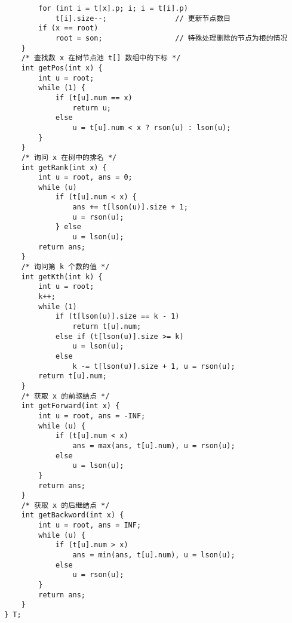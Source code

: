 \begin{verbatim}
        for (int i = t[x].p; i; i = t[i].p)
            t[i].size--;                // 更新节点数目
        if (x == root)
            root = son;                 // 特殊处理删除的节点为根的情况
    }
    /* 查找数 x 在树节点池 t[] 数组中的下标 */
    int getPos(int x) {
        int u = root;
        while (1) {
            if (t[u].num == x)
                return u;
            else
                u = t[u].num < x ? rson(u) : lson(u);
        }
    }
    /* 询问 x 在树中的排名 */
    int getRank(int x) {
        int u = root, ans = 0;
        while (u)
            if (t[u].num < x) {
                ans += t[lson(u)].size + 1;
                u = rson(u);
            } else
                u = lson(u);
        return ans;
    }
    /* 询问第 k 个数的值 */
    int getKth(int k) {
        int u = root;
        k++;
        while (1)
            if (t[lson(u)].size == k - 1)
                return t[u].num;
            else if (t[lson(u)].size >= k)
                u = lson(u);
            else
                k -= t[lson(u)].size + 1, u = rson(u);
        return t[u].num;
    }
    /* 获取 x 的前驱结点 */
    int getForward(int x) {
        int u = root, ans = -INF;
        while (u) {
            if (t[u].num < x)
                ans = max(ans, t[u].num), u = rson(u);
            else
                u = lson(u);
        }
        return ans;
    }
    /* 获取 x 的后继结点 */
    int getBackword(int x) {
        int u = root, ans = INF;
        while (u) {
            if (t[u].num > x)
                ans = min(ans, t[u].num), u = lson(u);
            else
                u = rson(u);
        }
        return ans;
    }
} T;    
\end{verbatim}

